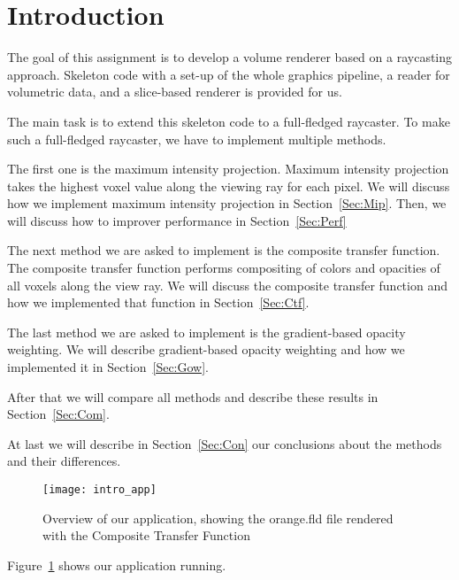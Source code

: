 \section{Introduction}
	The goal of this assignment is to develop a volume renderer based on a raycasting approach. 
	Skeleton code with a set-up of the whole graphics pipeline, a reader for volumetric data, and a slice-based renderer is provided for us.
	
	The main task is to extend this skeleton code to a full-fledged raycaster. 
	To make such a full-fledged raycaster, we have to implement multiple methods.
	
	The first one is the maximum intensity projection.
	Maximum intensity projection takes the highest voxel value along the viewing ray for each pixel.
	We will discuss how we implement maximum intensity projection in Section~\ref{Sec:Mip}.
	Then, we will discuss how to improver performance in Section~\ref{Sec:Perf}
	
	The next method we are asked to implement is the composite transfer function. 
	The composite transfer function performs compositing of colors and opacities of all voxels along the view ray.
	We will discuss the composite transfer function and how we implemented that function in Section~\ref{Sec:Ctf}.
	
	The last method we are asked to implement is the gradient-based opacity weighting.
	We will describe gradient-based opacity weighting and how we implemented it in Section~\ref{Sec:Gow}.
	
	After that we will compare all methods and describe these results in Section~\ref{Sec:Com}.
	
	At last we will describe in Section~\ref{Sec:Con} our conclusions about the methods and their differences.
	
	\begin{figure}[H]
		\centering
		\texttt{[image: intro\_app]}
		\caption{Overview of our application, showing the orange.fld file rendered with the Composite Transfer Function}
		\label{fig:intro}
	\end{figure}

	Figure~\ref{fig:intro} shows our application running.
